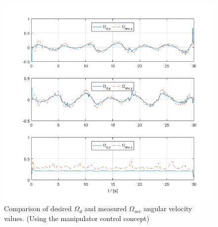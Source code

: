 \begin{figure}[h!]
	\centering
	\includegraphics[width=\columnwidth]{./pictures/manip_traj_omega.png}
	\caption{Comparison of desired $\Omega_d$ and measured $\Omega_{mv}$ angular velocity values. (Using the manipulator control concept)}
	\label{fig:manip_omega}
\end{figure}
